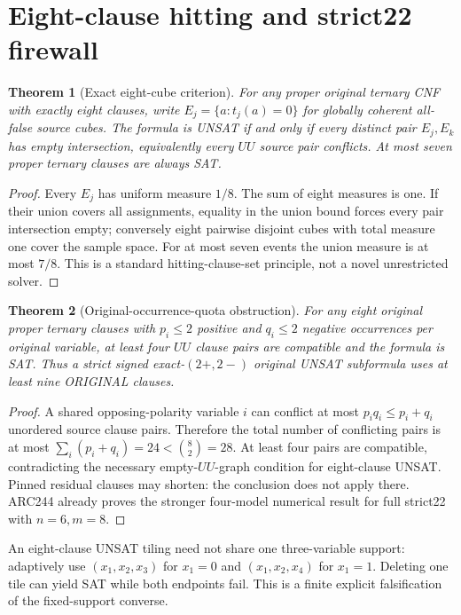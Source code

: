 \documentclass[10pt]{article}
\newtheorem{theorem}{Theorem}
\begin{document}
\section{Eight-clause hitting and strict22 firewall}
\begin{theorem}[Exact eight-cube criterion]
For any proper original ternary CNF with exactly eight clauses, write $E_j=\{a:t_j(a)=0\}$ for globally coherent all-false source cubes. The formula is UNSAT if and only if every distinct pair $E_j,E_k$ has empty intersection, equivalently every $UU$ source pair conflicts. At most seven proper ternary clauses are always SAT.
\end{theorem}
\begin{proof}
Every $E_j$ has uniform measure $1/8$. The sum of eight measures is one. If their union covers all assignments, equality in the union bound forces every pair intersection empty; conversely eight pairwise disjoint cubes with total measure one cover the sample space. For at most seven events the union measure is at most $7/8$. This is a standard hitting-clause-set principle, not a novel unrestricted solver.
\end{proof}
\begin{theorem}[Original-occurrence-quota obstruction]
For any eight original proper ternary clauses with $p_i\le2$ positive and $q_i\le2$ negative occurrences per original variable, at least four $UU$ clause pairs are compatible and the formula is SAT. Thus a strict signed exact-$(2+,2-)$ original UNSAT subformula uses at least nine ORIGINAL clauses.
\end{theorem}
\begin{proof}
A shared opposing-polarity variable $i$ can conflict at most $p_iq_i\le p_i+q_i$ unordered source clause pairs. Therefore the total number of conflicting pairs is at most $\sum_i(p_i+q_i)=24<\binom82=28$. At least four pairs are compatible, contradicting the necessary empty-$UU$-graph condition for eight-clause UNSAT. Pinned residual clauses may shorten: the conclusion does not apply there. ARC244 already proves the stronger four-model numerical result for full strict22 with $n=6,m=8$.
\end{proof}
An eight-clause UNSAT tiling need not share one three-variable support: adaptively use $(x_1,x_2,x_3)$ for $x_1=0$ and $(x_1,x_2,x_4)$ for $x_1=1$. Deleting one tile can yield SAT while both endpoints fail. This is a finite explicit falsification of the fixed-support converse.
\end{document}

